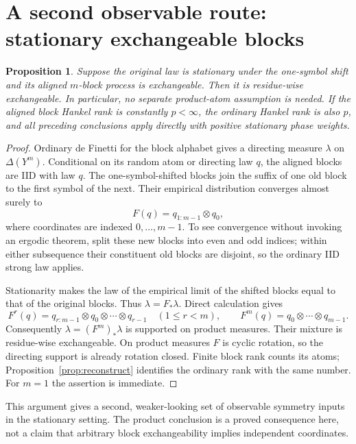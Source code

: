\documentclass[11pt]{article}
\newtheorem{proposition}[theorem]{Proposition}
\theoremstyle{remark}\newtheorem{remark}[theorem]{Remark}
\begin{document}
\section{A second observable route: stationary exchangeable blocks}
\begin{proposition}\label{prop:stationaryblocks}
Suppose the original law is stationary under the one-symbol shift and its aligned $m$-block process is exchangeable. Then it is residue-wise exchangeable. In particular, no separate product-atom assumption is needed. If the aligned block Hankel rank is constantly $p<\infty$, the ordinary Hankel rank is also $p$, and all preceding conclusions apply directly with positive stationary phase weights.
\end{proposition}
\begin{proof}
Ordinary de Finetti for the block alphabet gives a directing measure $\lambda$ on $\Delta(Y^m)$. Conditional on its random atom or directing law $q$, the aligned blocks are IID with law $q$. The one-symbol-shifted blocks join the suffix of one old block to the first symbol of the next. Their empirical distribution converges almost surely to
\[
F(q)=q_{1:m-1}\otimes q_0,
\]
where coordinates are indexed $0,\ldots,m-1$. To see convergence without invoking an ergodic theorem, split these new blocks into even and odd indices; within either subsequence their constituent old blocks are disjoint, so the ordinary IID strong law applies.

Stationarity makes the law of the empirical limit of the shifted blocks equal to that of the original blocks. Thus $\lambda=F_*\lambda$. Direct calculation gives
\[
F^r(q)=q_{r:m-1}\otimes q_0\otimes\cdots\otimes q_{r-1}
\quad(1\leq r<m),\qquad
F^m(q)=q_0\otimes\cdots\otimes q_{m-1}.
\]
Consequently $\lambda=(F^m)_*\lambda$ is supported on product measures. Their mixture is residue-wise exchangeable. On product measures $F$ is cyclic rotation, so the directing support is already rotation closed. Finite block rank counts its atoms; Proposition~\ref{prop:reconstruct} identifies the ordinary rank with the same number. For $m=1$ the assertion is immediate.
\end{proof}
This argument gives a second, weaker-looking set of observable symmetry inputs in the stationary setting. The product conclusion is a proved consequence here, not a claim that arbitrary block exchangeability implies independent coordinates.
\end{document}
